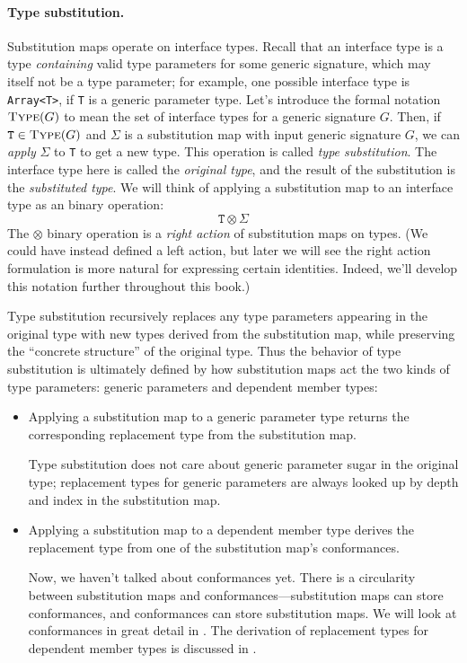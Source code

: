 \documentclass[../generics]{subfiles}
\begin{document}
\paragraph{Type substitution.} Substitution maps operate on interface types. Recall that an interface type is a type \emph{containing} valid type parameters for some generic signature, which may itself not be a type parameter; for example, one possible interface type is \texttt{Array<T>}, if \texttt{T} is a generic parameter type. Let's introduce the formal notation $\textsc{Type}({G})$ to mean the set of interface types for a generic signature $G$. Then, if $\texttt{T}\in\textsc{Type}({G})$ and $\Sigma$ is a substitution map with input generic signature $G$, we can \emph{apply} $\Sigma$ to \texttt{T} to get a new type. This operation is called \emph{type substitution}. The interface type here is called the \emph{original type}, and the result of the substitution is the \emph{substituted type}. We will think of applying a substitution map to an interface type as an binary operation: \[\texttt{T}\otimes\Sigma\]
The \index{$\otimes$}$\otimes$ binary operation is a \emph{right action} of substitution maps on types. (We could have instead defined a left action, but later we will see the right action formulation is more natural for expressing certain identities. Indeed, we'll develop this notation further throughout this book.)

Type substitution recursively replaces any type parameters appearing in the original type with new types derived from the substitution map, while preserving the ``concrete structure'' of the original type. Thus the behavior of type substitution is ultimately defined by how substitution maps act the two kinds of type parameters: generic parameters and dependent member types:
\begin{itemize}
\item Applying a substitution map to a generic parameter type returns the corresponding replacement type from the substitution map.

Type substitution does not care about generic parameter sugar in the original type; replacement types for generic parameters are always looked up by depth and index in the substitution map.

\item Applying a substitution map to a dependent member type derives the replacement type from one of the substitution map's conformances.

Now, we haven't talked about conformances yet. There is a circularity between substitution maps and conformances---substitution maps can store conformances, and conformances can store substitution maps. We will look at conformances in great detail in . The derivation of replacement types for dependent member types is discussed in .
\end{itemize}
\end{document}

